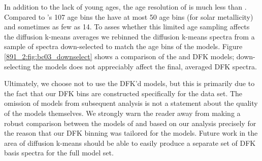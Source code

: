
In addition to the lack of young ages, the age resolution of
 is much less than
. Compared to 's 107 age
bins the  have at most 50 age bins (for solar
metallicity) and sometimes as few as 14. To asses whether this limited
age sampling affects the diffusion k-means averages we rebinned the
 diffusion k-means spectra from a sample of
 spectra down-selected to match the age bins of
the  models. Figure \ref{891_2:fig:bc03_downselect}
shows a comparison of the  and
 DFK models; down-selecting the
 models does not appreciably affect the final,
averaged DFK spectra.

Ultimately, we choose not to use the DFK'd 
models, but this is primarily due to the fact that our DFK bins are
constructed specifically for the  data set. The
omission of  models from subsequent analysis is
not a statement about the quality of the models themselves. We
strongly warn the reader away from making a robust comparison between
the models of  and  based
on our analysis precisely for the reason that our DFK binning was
tailored for the  models.  Future work in the
area of diffusion k-means should be able to easily produce a separate
set of DFK basis spectra for the full  model
set.


